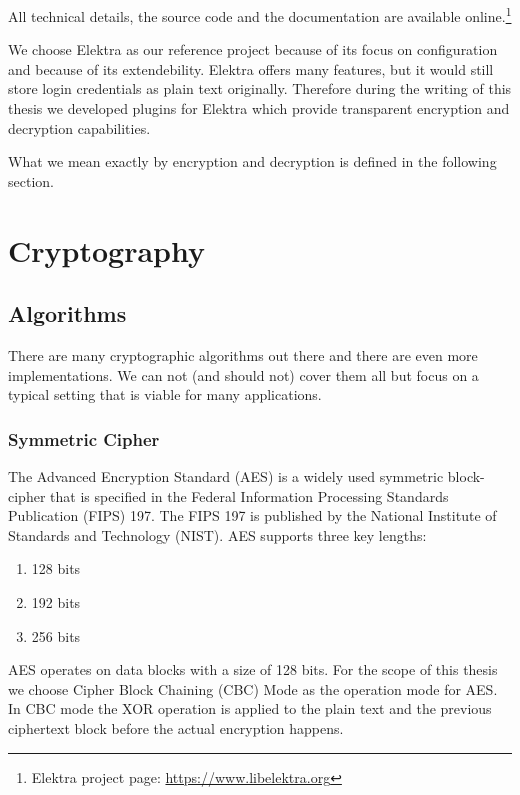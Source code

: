 All technical details, the source code and the documentation are available online.\footnote{Elektra project page: \url{https://www.libelektra.org}}

We choose Elektra as our reference project because of its focus on configuration and because of its extendebility.
Elektra offers many features, but it would still store login credentials as plain text originally.
Therefore during the writing of this thesis we developed plugins for Elektra which provide transparent encryption and decryption capabilities.

What we mean exactly by encryption and decryption is defined in the following section.

\section{Cryptography}

\subsection{Algorithms}

There are many cryptographic algorithms out there and there are even more implementations.
We can not (and should not) cover them all but focus on a typical setting that is viable for many applications.

\subsubsection{Symmetric Cipher}

The Advanced Encryption Standard (AES) is a widely used symmetric block-cipher that is specified in the Federal Information Processing Standards Publication (FIPS) 197.
The FIPS 197 is published by the National Institute of Standards and Technology (NIST).\cite{fips197}
AES supports three key lengths:
\begin{enumerate}
  \item 128 bits
  \item 192 bits
  \item 256 bits
\end{enumerate}

AES operates on data blocks with a size of 128 bits.\cite{fips197,stallings2014}
For the scope of this thesis we choose Cipher Block Chaining (CBC) Mode as the operation mode for AES.
In CBC mode the XOR operation is applied to the plain text and the previous ciphertext block before the actual encryption happens.\cite{bruceschneier1996,stallings2014}


